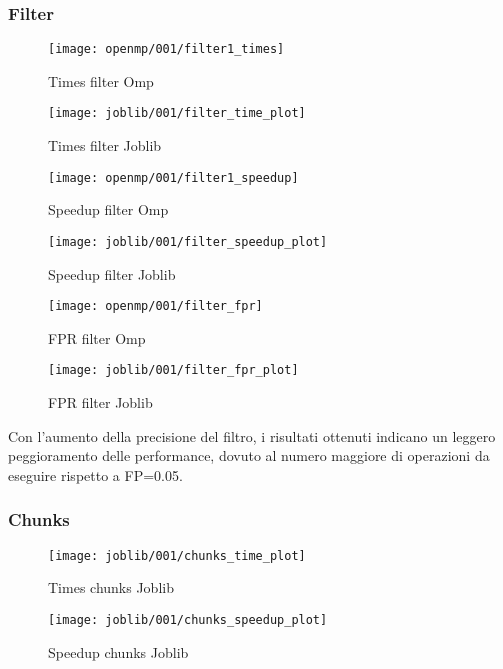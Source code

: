 \subsubsection{Filter}\label{subsubsec:filter}
\begin{figure}[H]
    \centering
    \texttt{[image: openmp/001/filter1\_times]}
        \caption{Times filter Omp}\label{fig:filter_time_omp}
    \endminipage\hfill
    \texttt{[image: joblib/001/filter\_time\_plot]}
        \caption{Times filter Joblib}\label{fig:filter_time_joblib}
    \endminipage\hfill
\end{figure}
\begin{figure}[H]
    \centering
    \texttt{[image: openmp/001/filter1\_speedup]}
        \caption{Speedup filter Omp}\label{fig:filter_speedup_omp}
    \endminipage\hfill
    \texttt{[image: joblib/001/filter\_speedup\_plot]}
        \caption{Speedup filter Joblib}\label{fig:filter_speedup_joblib}
    \endminipage\hfill
\end{figure}
\begin{figure}[H]
    \centering
    \texttt{[image: openmp/001/filter\_fpr]}
        \caption{FPR filter Omp}\label{fig:filter_fpr_omp}
    \endminipage\hfill
    \texttt{[image: joblib/001/filter\_fpr\_plot]}
        \caption{FPR filter Joblib}\label{fig:filter_fpr_joblib}
    \endminipage\hfill
\end{figure}

Con l'aumento della precisione del filtro, i risultati ottenuti indicano un leggero peggioramento delle performance,
dovuto al numero maggiore di operazioni da eseguire rispetto a FP=0.05.

\subsubsection{Chunks}\label{subsubsec:chunks}
\begin{figure}[H]
    \centering
    \texttt{[image: joblib/001/chunks\_time\_plot]}
        \caption{Times chunks Joblib}\label{fig:chunks_time_joblib}
    \endminipage\hfill
    \texttt{[image: joblib/001/chunks\_speedup\_plot]}
        \caption{Speedup chunks Joblib}\label{fig:chunks_speedup_joblib}
    \endminipage\hfill
\end{figure}

